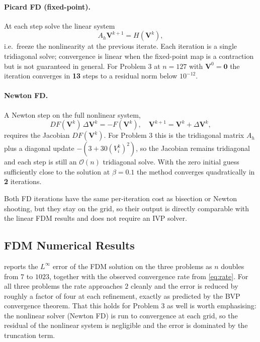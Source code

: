 \documentclass[11pt]{article}
\theoremstyle{plain}
\theoremstyle{remark}
\newcommand{\Linf}{L^\infty}
\newcommand{\Ah}{A_h}
\newcommand{\bigO}{\mathcal{O}}
\begin{document}
\paragraph{Picard FD (fixed-point).} At each step solve the linear system
\begin{equation}
\Ah \mathbf{V}^{k+1} = H(\mathbf{V}^k),
\label{eq:picard}
\end{equation}
i.e.\ freeze the nonlinearity at the previous iterate. Each iteration is
a single tridiagonal solve; convergence is linear when the fixed-point
map is a contraction but is not guaranteed in general. For Problem 3 at
$n = 127$ with $\mathbf{V}^0 = \mathbf{0}$ the iteration converges in
\textbf{13} steps to a residual norm below $10^{-12}$.

\paragraph{Newton FD.} A Newton step on the full nonlinear system,
\begin{equation}
DF(\mathbf{V}^k)\,\Delta \mathbf{V}^k = -F(\mathbf{V}^k),
\quad \mathbf{V}^{k+1} = \mathbf{V}^k + \Delta \mathbf{V}^k,
\label{eq:newtonfd}
\end{equation}
requires the Jacobian $DF(\mathbf{V}^k)$. For Problem 3 this is the
tridiagonal matrix $\Ah$ plus a diagonal update
$-(3 + 30 (V^k_i)^2)$, so the Jacobian remains tridiagonal and each step
is still an $\bigO(n)$ tridiagonal solve. With the zero initial guess
sufficiently close to the solution at $\beta = 0.1$ the method converges
quadratically in \textbf{2} iterations.

Both FD iterations have the same per-iteration cost as bisection or Newton
shooting, but they stay on the grid, so their output is directly
comparable with the linear FDM results and does not require an IVP solver.


\subsection{FDM Numerical Results}
\label{sec:fdm_results}

 reports the $\Linf$ error of the FDM solution on the
three problems as $n$ doubles from $7$ to $1023$, together with the
observed convergence rate from \cref{eq:rate}. For all three problems
the rate approaches $2$ cleanly and the error is reduced by roughly a
factor of four at each refinement, exactly as predicted by the BVP
convergence theorem. That this holds for Problem 3 as well is worth
emphasising: the nonlinear solver (Newton FD) is run to convergence at
each grid, so the residual of the nonlinear system is negligible and
the error is dominated by the truncation term.
\end{document}
